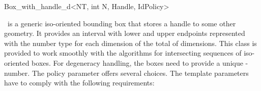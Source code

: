 

\begin{ccRefClass}{Box_with_handle_d<NT, int N, Handle, IdPolicy>}
\ccDefinition

\ccRefName\ is a generic iso-oriented bounding box that stores a
handle to some other geometry. It provides an
interval with lower and upper endpoints represented with the number
type  for each dimension of the total of  dimensions.
This class is provided to work smoothly with the algorithms for
intersecting sequences of iso-oriented boxes. For degeneracy handling,
the boxes need to provide a unique -number. The policy
parameter  offers several choices. The template
parameters have to comply with the following requirements:


\end{ccRefClass}

